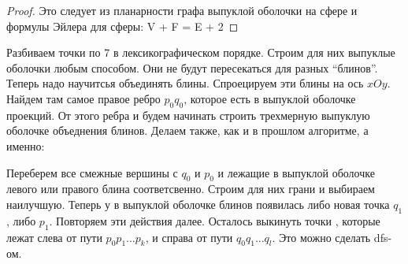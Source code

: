 \documentclass[document.tex]{subfiles}
\begin{document}
\begin{proof}
	Это следует из планарности графа выпуклой оболочки на сфере и формулы Эйлера для сферы: V + F = E + 2
\end{proof}

\begin{algorithm}
	Разбиваем точки по 7 в лексикографическом порядке. Строим для них выпуклые оболочки любым способом. Они не будут пересекаться для разных ``блинов''. Теперь надо научитсья объединять блины. Спроецируем эти блины на ось $xOy$. Найдем там самое правое ребро $p_0q_0$, которое есть в выпуклой оболочке проекций. От этого ребра и будем начинать строить трехмерную выпуклую оболочке объеднения блинов. Делаем также, как и в прошлом алгоритме, а именно:

	Переберем все смежные вершины с $q_0$ и $p_0$ и лежащие в выпуклой оболочке левого или правого блина соответсвенно. Строим для них грани и выбираем наилучшую. Теперь у в выпуклой оболочке блинов появилась либо новая точка $q_1$, либо $p_1$. Повторяем эти действия далее. Осталось выкинуть точки , которые лежат слева от пути $p_0p_1 \ldots p_k$, и справа от пути $q_0q_1 \ldots q_l$. Это можно сделать dfs-ом.
\end{algorithm}
\end{document}
